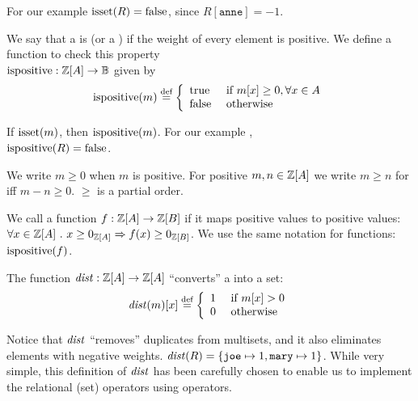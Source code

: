 \ifzsetexamples
\noindent For our example $\mbox{isset}(R) = \mbox{false}$, since $R[\texttt{anne}] = -1$.
\fi

\begin{definition}
We say that a \zr is  (or a ) if the weight of every element is
positive.  We define a function to check this property \\
$\mbox{ispositive} : \mathbb{Z}[A] \rightarrow \mathbb{B}$
given by
$$\mbox{ispositive}(m) \stackrel{\textrm{\scriptsize def}}{=} \left\{
\begin{array}{ll}
  \mbox{true} & \mbox{ if } m[x] \geq 0, \forall x \in A \\
  \mbox{false} & \mbox{ otherwise}
\end{array}
\right.$$
\end{definition}
If $\mbox{isset}(m)$, then $\mbox{ispositive}(m)$.  For our example \zr, \\
$\mbox{ispositive}(R) = \mbox{false}$.

We write $m \geq 0$ when $m$ is positive.  For positive $m, n \in
\mathbb{Z}[A]$ we write $m \geq n$ for iff $m - n \geq 0$.  $\geq$ is a
partial order.

We call a function $f : \mathbb{Z}[A] \rightarrow \mathbb{Z}[B]$  if it maps
positive values to positive values:
$\forall x \in \mathbb{Z}[A]~.~x \geq 0_{\mathbb{Z}[A]} \Rightarrow f(x) \geq 0_{\mathbb{Z}[B]}$.
We use the same notation for functions: $\mbox{ispositive}(f)$.

\begin{definition}[distinct]
The function $\mathit{dist}: \\ \mathbb{Z}[A] \rightarrow \mathbb{Z}[A]$
``converts'' a \zr into a set:
$$\mathit{dist}(m)[x] \stackrel{\textrm{\scriptsize def}}{=} \left\{
\begin{array}{ll}
  1 & \mbox{ if } m[x] > 0 \\
  0 & \mbox{ otherwise}
\end{array}
\right.
$$
\end{definition}

Notice that $\mathit{dist}$ ``removes'' duplicates from multisets, and it also eliminates
elements with negative weights.
\ifzsetexamples
$\mathit{dist}(R) = \{ \texttt{joe} \mapsto 1, \texttt{mary} \mapsto 1 \}$.
\fi
While very simple, this definition of $\mathit{dist}$ has been carefully
chosen to enable us to implement the relational (set) operators
using \zrs operators.

%
%
